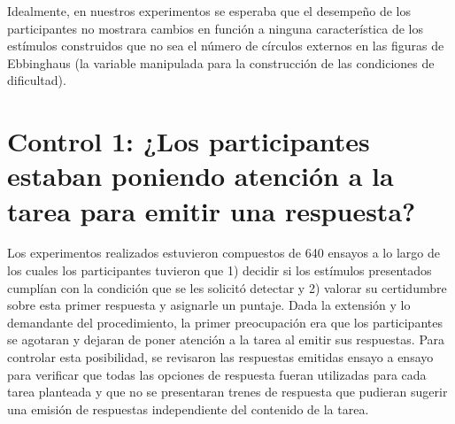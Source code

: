 Idealmente, en nuestros experimentos se esperaba que el desempeño de los participantes no mostrara cambios en función a ninguna característica de los estímulos construidos que no sea el número de círculos externos en las figuras de Ebbinghaus (la variable manipulada para la construcción de las condiciones de dificultad).








\section{Control 1: ¿Los participantes estaban poniendo atención a la tarea para emitir una respuesta?}

Los experimentos realizados estuvieron compuestos de 640 ensayos a lo largo de los cuales los participantes tuvieron que 1) decidir si los estímulos presentados cumplían con la condición que se les solicitó detectar y 2) valorar su certidumbre sobre esta primer respuesta y asignarle un puntaje. Dada la extensión y lo demandante del procedimiento, la primer preocupación era que los participantes se agotaran y dejaran de poner atención a la tarea al emitir sus respuestas. Para controlar esta posibilidad, se revisaron las respuestas emitidas ensayo a ensayo para verificar que todas las opciones de respuesta fueran utilizadas para cada tarea planteada y que no se presentaran trenes de respuesta que pudieran sugerir una emisión de respuestas independiente del contenido de la tarea.\\

